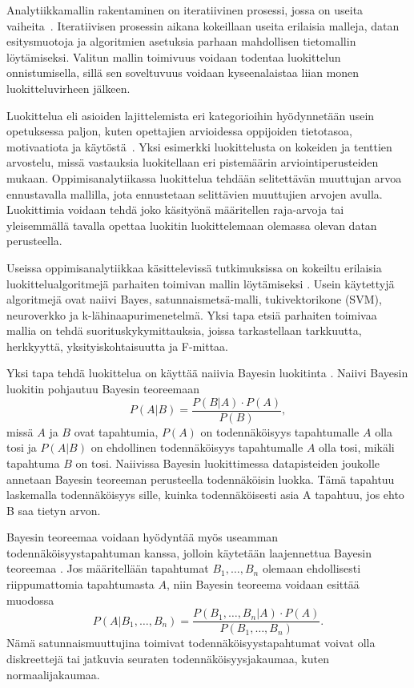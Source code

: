 Analytiikkamallin rakentaminen on iteratiivinen prosessi, jossa on useita vaiheita~\citep{hamalainenClassifiersEducationalData2010}. Iteratiivisen prosessin aikana kokeillaan useita erilaisia malleja, datan esitysmuotoja ja algoritmien asetuksia parhaan mahdollisen tietomallin löytämiseksi. Valitun mallin toimivuus voidaan todentaa luokittelun onnistumisella, sillä sen soveltuvuus voidaan kyseenalaistaa liian monen luokitteluvirheen jälkeen.

Luokittelua eli asioiden lajittelemista eri kategorioihin hyödynnetään usein opetuksessa paljon, kuten opettajien arvioidessa oppijoiden tietotasoa, motivaatiota ja käytöstä~\citep{hamalainenClassifiersEducationalData2010}. Yksi esimerkki luokittelusta on kokeiden ja tenttien arvostelu, missä vastauksia luokitellaan eri pistemäärin arviointiperusteiden mukaan. Oppimisanalytiikassa luokittelua tehdään selitettävän muuttujan arvoa ennustavalla mallilla, jota ennustetaan selittävien muuttujien arvojen avulla. Luokittimia voidaan tehdä joko käsityönä määritellen raja-arvoja tai yleisemmällä tavalla opettaa luokitin luokittelemaan olemassa olevan datan perusteella.

Useissa oppimisanalytiikkaa käsittelevissä tutkimuksissa on kokeiltu erilaisia luokittelualgoritmejä parhaiten toimivan mallin löytämiseksi \citep{akcapinarUsingLearningAnalytics2019}. Usein käytettyjä algoritmejä ovat naiivi Bayes, satunnaismetsä-malli, tukivektorikone (SVM), neuroverkko ja k-lähinaapurimenetelmä. Yksi tapa etsiä parhaiten toimivaa mallia on tehdä suorituskykymittauksia, joissa tarkastellaan tarkkuutta, herkkyyttä, yksityiskohtaisuutta ja F-mittaa.

Yksi tapa tehdä luokittelua on käyttää naiivia Bayesin luokitinta \citep{natinggaDataScienceAlgorithms2018}. Naiivi Bayesin luokitin pohjautuu Bayesin teoreemaan $$P(A | B) = \frac{P(B | A) \cdot P(A)}{P(B)},$$ missä $A$ ja $B$ ovat tapahtumia, $P(A)$ on todennäköisyys tapahtumalle $A$ olla tosi ja $P(A | B)$ on ehdollinen todennäköisyys tapahtumalle $A$ olla tosi, mikäli tapahtuma $B$ on tosi. Naiivissa Bayesin luokittimessa datapisteiden joukolle annetaan Bayesin teoreeman perusteella todennäköisin luokka. Tämä tapahtuu laskemalla todennäköisyys sille, kuinka todennäköisesti asia A tapahtuu, jos ehto B saa tietyn arvon.

Bayesin teoreemaa voidaan hyödyntää myös useamman todennäköisyystapahtuman kanssa, jolloin käytetään laajennettua Bayesin teoreemaa \citep{natinggaDataScienceAlgorithms2018}. Jos määritellään tapahtumat $B_1, \ldots, B_n$ olemaan ehdollisesti riippumattomia tapahtumasta $A$, niin Bayesin teoreema voidaan esittää muodossa $$P(A | B_1, \ldots, B_n) = \frac{P(B_1, \ldots, B_n | A) \cdot P(A)}{P(B_1, \ldots, B_n)}.$$ Nämä satunnaismuuttujina toimivat todennäköisyystapahtumat voivat olla diskreettejä tai jatkuvia seuraten todennäköisyysjakaumaa, kuten normaalijakaumaa.

